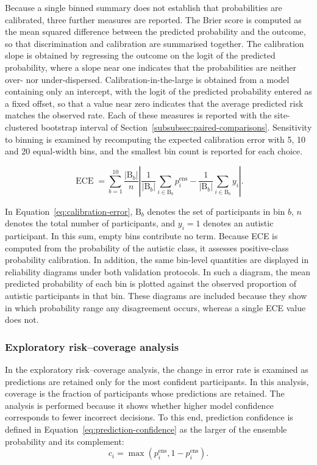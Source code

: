 Because a single binned summary does not establish that probabilities are calibrated, three
further measures are reported. The Brier score is computed as the mean squared difference
between the predicted probability and the outcome, so that discrimination and calibration are
summarised together. The calibration slope is obtained by regressing the outcome on the
logit of the predicted probability, where a slope near one indicates that the probabilities
are neither over- nor under-dispersed. Calibration-in-the-large is obtained from a model
containing only an intercept, with the logit of the predicted probability entered as a fixed
offset, so that a value near zero indicates that the average predicted risk matches the
observed rate. Each of these measures is reported with the site-clustered bootstrap interval
of Section~\ref{subsubsec:paired-comparisons}. Sensitivity to binning is examined by
recomputing the expected calibration error with 5, 10 and 20 equal-width bins, and the
smallest bin count is reported for each choice.

\begin{equation}
\operatorname{ECE}
=
\sum_{b=1}^{10}
\frac{|\mathrm{B}_b|}{n}
\left|
\frac{1}{|\mathrm{B}_b|}
\sum_{i\in\mathrm{B}_b}p_i^{\mathrm{ens}}
-
\frac{1}{|\mathrm{B}_b|}
\sum_{i\in\mathrm{B}_b}y_i
\right|.
\label{eq:calibration-error}
\end{equation}

In Equation~\eqref{eq:calibration-error}, $\mathrm{B}_b$ denotes the set of participants in bin $b$,
$n$ denotes the total number of participants, and $y_i=1$ denotes an autistic participant.
In this sum, empty bins contribute no term. Because ECE is computed from the probability of
the autistic class, it assesses positive-class probability calibration. In addition, the
same bin-level quantities are displayed in reliability diagrams under both validation
protocols. In such a diagram, the mean predicted probability of each bin is plotted against
the observed proportion of autistic participants in that bin. These diagrams are included
because they show in which probability range any disagreement occurs, whereas a single ECE
value does not.

\subsubsection{Exploratory risk--coverage analysis}
\label{subsubsec:risk-coverage}

In the exploratory risk--coverage analysis, the change in error rate is examined as
predictions are retained only for the most confident participants. In this analysis,
coverage is the fraction of participants whose predictions are retained. The analysis is
performed because it shows whether higher model confidence corresponds to fewer incorrect
decisions. To this end, prediction confidence is defined in Equation~\eqref{eq:prediction-confidence} as the
larger of the ensemble probability and its complement:
\begin{equation}
c_i
=
\max\left(p_i^{\mathrm{ens}},1-p_i^{\mathrm{ens}}\right).
\label{eq:prediction-confidence}
\end{equation}

